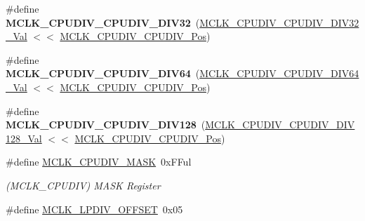 \begin{DoxyCompactItemize}
\item 
\hypertarget{group___s_a_m_l21___m_c_l_k_ga0c8e9c97c478acc4f8f38cfebfc5a7ff}{}\#define {\bfseries M\+C\+L\+K\+\_\+\+C\+P\+U\+D\+I\+V\+\_\+\+C\+P\+U\+D\+I\+V\+\_\+\+D\+I\+V32}~(\hyperlink{group___s_a_m_l21___m_c_l_k_ga448a4c4d751ee50c5d4b5ba090e1b59a}{M\+C\+L\+K\+\_\+\+C\+P\+U\+D\+I\+V\+\_\+\+C\+P\+U\+D\+I\+V\+\_\+\+D\+I\+V32\+\_\+\+Val}  $<$$<$ \hyperlink{group___s_a_m_l21___m_c_l_k_gae6faf0af5e1e22725e3c3080e2b94af7}{M\+C\+L\+K\+\_\+\+C\+P\+U\+D\+I\+V\+\_\+\+C\+P\+U\+D\+I\+V\+\_\+\+Pos})\label{group___s_a_m_l21___m_c_l_k_ga0c8e9c97c478acc4f8f38cfebfc5a7ff}

\item 
\hypertarget{group___s_a_m_l21___m_c_l_k_ga5717b327de2a33a70201490cc80b7b54}{}\#define {\bfseries M\+C\+L\+K\+\_\+\+C\+P\+U\+D\+I\+V\+\_\+\+C\+P\+U\+D\+I\+V\+\_\+\+D\+I\+V64}~(\hyperlink{group___s_a_m_l21___m_c_l_k_gaac6c3fe67fb4444a6514401b65749a0e}{M\+C\+L\+K\+\_\+\+C\+P\+U\+D\+I\+V\+\_\+\+C\+P\+U\+D\+I\+V\+\_\+\+D\+I\+V64\+\_\+\+Val}  $<$$<$ \hyperlink{group___s_a_m_l21___m_c_l_k_gae6faf0af5e1e22725e3c3080e2b94af7}{M\+C\+L\+K\+\_\+\+C\+P\+U\+D\+I\+V\+\_\+\+C\+P\+U\+D\+I\+V\+\_\+\+Pos})\label{group___s_a_m_l21___m_c_l_k_ga5717b327de2a33a70201490cc80b7b54}

\item 
\hypertarget{group___s_a_m_l21___m_c_l_k_gab2eb2e14c7741ad1675bf06eed171ae5}{}\#define {\bfseries M\+C\+L\+K\+\_\+\+C\+P\+U\+D\+I\+V\+\_\+\+C\+P\+U\+D\+I\+V\+\_\+\+D\+I\+V128}~(\hyperlink{group___s_a_m_l21___m_c_l_k_ga1823f80244b12bdfd6a2c0b2b5aad95c}{M\+C\+L\+K\+\_\+\+C\+P\+U\+D\+I\+V\+\_\+\+C\+P\+U\+D\+I\+V\+\_\+\+D\+I\+V128\+\_\+\+Val} $<$$<$ \hyperlink{group___s_a_m_l21___m_c_l_k_gae6faf0af5e1e22725e3c3080e2b94af7}{M\+C\+L\+K\+\_\+\+C\+P\+U\+D\+I\+V\+\_\+\+C\+P\+U\+D\+I\+V\+\_\+\+Pos})\label{group___s_a_m_l21___m_c_l_k_gab2eb2e14c7741ad1675bf06eed171ae5}

\item 
\hypertarget{group___s_a_m_l21___m_c_l_k_gab671f30e14e4976663447bcdf727ea01}{}\#define \hyperlink{group___s_a_m_l21___m_c_l_k_gab671f30e14e4976663447bcdf727ea01}{M\+C\+L\+K\+\_\+\+C\+P\+U\+D\+I\+V\+\_\+\+M\+A\+S\+K}~0x\+F\+Ful\label{group___s_a_m_l21___m_c_l_k_gab671f30e14e4976663447bcdf727ea01}

\begin{DoxyCompactList}\small\item\em (M\+C\+L\+K\+\_\+\+C\+P\+U\+D\+I\+V) M\+A\+S\+K Register \end{DoxyCompactList}\item 
\hypertarget{group___s_a_m_l21___m_c_l_k_gae217da001f7399f8c4785842de7ac30a}{}\#define \hyperlink{group___s_a_m_l21___m_c_l_k_gae217da001f7399f8c4785842de7ac30a}{M\+C\+L\+K\+\_\+\+L\+P\+D\+I\+V\+\_\+\+O\+F\+F\+S\+E\+T}~0x05\label{group___s_a_m_l21___m_c_l_k_gae217da001f7399f8c4785842de7ac30a}


\end{DoxyCompactItemize}
